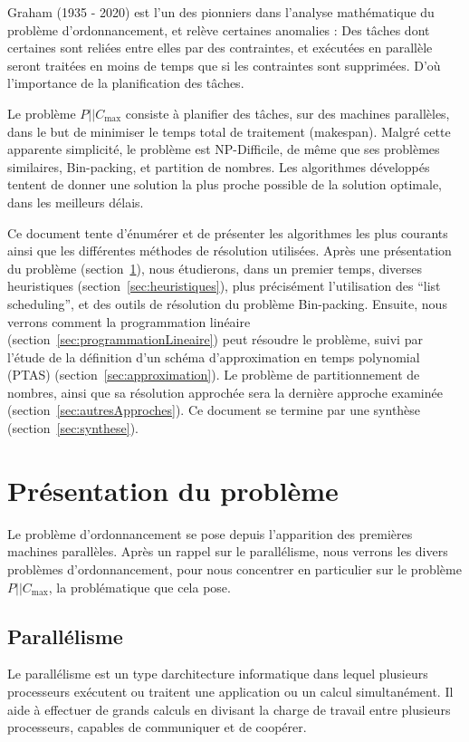 \documentclass[a4paper,12pt]{report}
\theoremstyle{plain}				%
\theoremstyle{definition}				%
\newcommand\problemGrahamP{$P||C_{\max}$\xspace}
\newcommand{\fco}[1]{\todo[author=FCO,color=blue,inline]{#1}}
\newcommand{\jb}[1]{\todo[author=JB,color=orange,inline]{#1}}
\begin{document}
Graham (1935 - 2020) est l'un des pionniers dans l'analyse
mathématique du problème d'ordonnancement, et relève certaines
anomalies \cite{graham1966bounds}: Des tâches dont certaines sont
reliées entre elles par des contraintes, et exécutées en parallèle
seront traitées en moins de temps que si les contraintes sont
supprimées.
D'où l'importance de la planification des tâches.

Le problème \problemGrahamP consiste à planifier des tâches, sur des
machines parallèles, dans le but de minimiser le temps total de
traitement (makespan).
Malgré cette apparente simplicité, le problème est NP-Difficile, de
même que ses problèmes similaires, Bin-packing, et partition de
nombres.
Les algorithmes développés tentent de donner une solution la plus
proche possible de la solution optimale, dans les meilleurs délais.

Ce document tente d’énumérer et de présenter les algorithmes les plus
courants ainsi que les différentes méthodes de résolution utilisées.
Après une présentation du problème (section~\ref{sec:pesentationProbleme}),
nous étudierons, dans un premier temps, diverses heuristiques (section~\ref{sec:heuristiques}),
  plus précisément l'utilisation des ``list scheduling'',
  et des outils de résolution du problème Bin-packing.
Ensuite, nous verrons comment la programmation linéaire
  (section~\ref{sec:programmationLineaire}) peut résoudre le problème,
suivi par l'étude de la définition d'un schéma d'approximation
  en temps polynomial (PTAS) (section~\ref{sec:approximation}).
Le problème de partitionnement de nombres, ainsi que sa
  résolution approchée sera la dernière approche examinée
  (section~\ref{sec:autresApproches}).
Ce document se termine par une synthèse (section~\ref{sec:synthese}).

\jb{Mettre des références vers les sections}
\fco{ok, fait}

\section{Présentation du problème} \label{sec:pesentationProbleme}

Le problème d'ordonnancement se pose depuis l'apparition des premières
machines parallèles.
Après un rappel sur le parallélisme, nous verrons les divers problèmes
d'ordonnancement, pour nous concentrer en particulier sur le problème
\problemGrahamP, la problématique que cela pose.


\subsection{Parallélisme} \label{ssec:pesentationProblemeParallelisme}
Le parallélisme est un type d{\textquotesingle}architecture informatique
dans lequel plusieurs processeurs exécutent ou traitent une application
ou un calcul simultanément. Il aide à effectuer de grands calculs en
divisant la charge de travail entre plusieurs processeurs, capables de
communiquer et de coopérer.
\end{document}
